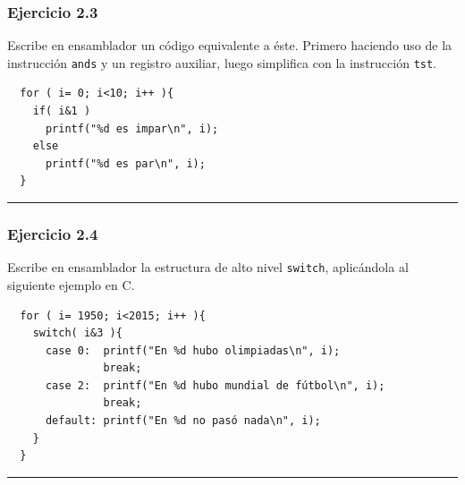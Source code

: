 \subsubsection{Ejercicio 2.3}

Escribe en ensamblador un código equivalente a éste. Primero
haciendo uso de la instrucción {\tt ands} y un registro auxiliar,
luego simplifica con la instrucción {\tt tst}.

\begin{center}
\begin{myfbox}
\small
\begin{minipage}{0.92\linewidth}
\begin{center}
\begin{minipage}{0.6\linewidth}
\begin{verbatim}
  for ( i= 0; i<10; i++ ){
    if( i&1 )
      printf("%d es impar\n", i);
    else
      printf("%d es par\n", i);
  }
\end{verbatim}
\end{minipage}
\end{center}
\begin{center}
\colorbox[gray]{1}{\rule{0cm}{7cm}\rule{11cm}{0cm}}
\end{center}
\end{minipage}
\end{myfbox}
\end{center}

\subsubsection{Ejercicio 2.4}

Escribe en ensamblador la estructura de alto nivel {\tt switch},
aplicándola al siguiente ejemplo en C.

\begin{center}
\begin{myfbox}
\small
\begin{minipage}{0.92\linewidth}
\begin{minipage}{0.6\linewidth}
\begin{verbatim}
  for ( i= 1950; i<2015; i++ ){
    switch( i&3 ){
      case 0:  printf("En %d hubo olimpiadas\n", i);
               break;
      case 2:  printf("En %d hubo mundial de fútbol\n", i);
               break;
      default: printf("En %d no pasó nada\n", i);
    }
  }
\end{verbatim}
\end{minipage}
\begin{center}
\colorbox[gray]{1}{\rule{0cm}{7cm}\rule{11cm}{0cm}}
\end{center}
\end{minipage}
\end{myfbox}
\end{center}

